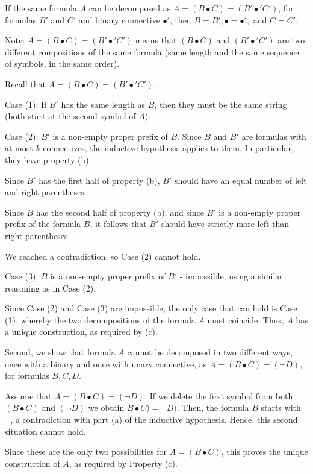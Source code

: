 \documentclass{article}
\begin{document}
If the same formula $A$ can be decomposed as $A = (B \bullet C) = (B' \bullet' C')$, for formulas $B'$ and $C'$ and binary connective $\bullet'$, then $B=B', \bullet = \bullet', $ and $C = C'$. 

Note: $A = (B \bullet C) = (B' \bullet' C')$ means that $(B \bullet C)$ and $(B' \bullet' C')$ are two different compositions of the same formula (same length and the same sequence of symbols, in the same order). 

Recall that $A = (B \bullet C) = (B' \bullet' C')$. 

Case (1): If $B'$ has the same length as $B$, then they must be the same string (both start at the second symbol of $A$). 

Case (2): $B'$ is a non-empty proper prefix of $B$. Since $B$ and $B'$ are formulas with at most $k$ connectives, the inductive hypothesis applies to them. In particular, they have property (b). 

Since $B'$ has the first half of property (b), $B'$ should have an equal number of left and right parentheses. 

Since $B$ has the second half of property (b), and since $B'$ is a non-empty proper prefix of the formula $B$, it follows that $B'$ should have strictly more left than right parentheses. 

We reached a contradiction, so Case (2) cannot hold. 

Case (3): $B$ is a non-empty proper prefix of $B'$ - impossible, using a similar reasoning as in Case (2). 

Since Case (2) and Case (3) are impossible, the only case that can hold is Case (1), whereby the two decompositions of the formula $A$ must coincide. Thus, $A$ has a unique construction, as required by (c). 

Second, we show that formula $A$ cannot be decomposed in two different ways, once with a binary and once with unary connective, as $A = (B \bullet C) = (\neg D),$ for formulas $B,C,D$. 

Assume that $A = (B \bullet C) = (\neg D)$. If we delete the first symbol from both $(B \bullet C)$ and $(\neg D)$ we obtain $B \bullet C) = \neg D)$. Then, the formula $B$ starts with $\neg$, a contradiction with part (a) of the inductive hypothesis. Hence, this second situation cannot hold. 

Since these are the only two possibilities for $A = (B \bullet C)$, this proves the unique construction of $A$, as required by Property (c).
\end{document}
